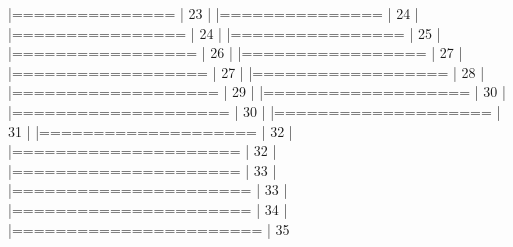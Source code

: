 \documentclass[10pt]{article}
\newenvironment{CodeChunk}{}{}
\begin{document}
\begin{CodeChunk}
\begin{CodeChunk}
\begin{CodeOutput}
  |===============                                                  |  23%
  |                                                                       
  |===============                                                  |  24%
  |                                                                       
  |================                                                 |  24%
  |                                                                       
  |================                                                 |  25%
  |                                                                       
  |=================                                                |  26%
  |                                                                       
  |=================                                                |  27%
  |                                                                       
  |==================                                               |  27%
  |                                                                       
  |==================                                               |  28%
  |                                                                       
  |===================                                              |  29%
  |                                                                       
  |===================                                              |  30%
  |                                                                       
  |====================                                             |  30%
  |                                                                       
  |====================                                             |  31%
  |                                                                       
  |====================                                             |  32%
  |                                                                       
  |=====================                                            |  32%
  |                                                                       
  |=====================                                            |  33%
  |                                                                       
  |======================                                           |  33%
  |                                                                       
  |======================                                           |  34%
  |                                                                       
  |=======================                                          |  35%

\end{CodeOutput}
\end{CodeChunk}
\end{CodeChunk}
\end{document}
